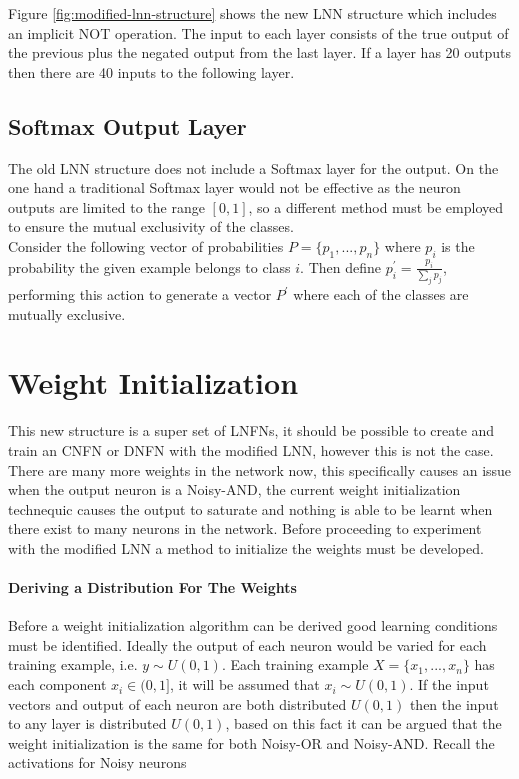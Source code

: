 Figure \ref{fig:modified-lnn-structure} shows the new LNN structure which includes an implicit NOT operation. The input to each layer consists of the true output of the previous plus the negated output from the last layer. If a layer has 20 outputs then there are 40 inputs to the following layer.\\

\subsection{Softmax Output Layer}
The old LNN structure does not include a Softmax layer for the output. On the one hand a traditional Softmax layer would not be effective as the neuron outputs are limited to the range $[0,1]$, so a different method must be employed to ensure the mutual exclusivity of the classes.\\

Consider the following vector of probabilities $P = \{p_1, ..., p_n\}$ where $p_i$ is the probability the given example belongs to class $i$. Then define $p_i^{'} = \frac{p_i}{\sum_j p_j}$, performing this action to generate a vector $P^{'}$ where each of the classes are mutually exclusive.


\section{Weight Initialization}

This new structure is a super set of LNFNs, it should be possible to create and train an CNFN or DNFN with the modified LNN, however this is not the case. There are many more weights in the network now, this specifically causes an issue when the output neuron is a Noisy-AND, the current weight initialization technequic causes the output to saturate and nothing is able to be learnt when there exist to many neurons in the network. Before proceeding to experiment with the modified LNN a method to initialize the weights must be developed.\\

\paragraph{Deriving a Distribution For The Weights}
Before a weight initialization algorithm can be derived good learning conditions must be identified. Ideally the output of each neuron would be varied for each training example, i.e. $y \sim U(0,1)$. Each training example $X = \{x_1, ..., x_n\}$ has each component $x_i \in (0,1]$, it will be assumed that $x_i \sim U(0,1)$. If the input vectors and output of each neuron are both distributed $U(0,1)$ then the input to any layer is distributed $U(0,1)$, based on this fact it can be argued that the weight initialization is the same for both Noisy-OR and Noisy-AND. Recall the activations for Noisy neurons\\

